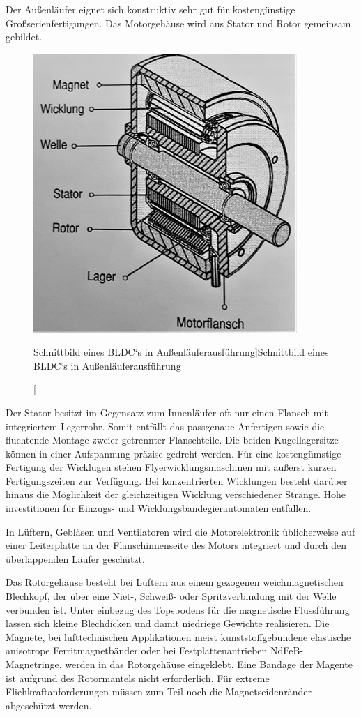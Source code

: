 Der Außenläufer eignet sich konstruktiv sehr gut für kostengünstige Großserienfertigungen. Das Motorgehäuse wird aus Stator und Rotor gemeinsam gebildet.
\begin{figure}[H]
  \centering
  \includegraphics[width=10cm]{./Grafiken/3_2}
  \caption[Schnittbild eines BLDC`s in Außenläuferausführung]{Schnittbild eines BLDC`s in Außenläuferausführung \parencite[S. 76]{Stölting2011}}
  \label{fig:3_2}
\end{figure}
Der Stator besitzt im Gegensatz zum Innenläufer oft nur einen Flansch mit integriertem Legerrohr. Somit entfällt das passgenaue Anfertigen sowie die fluchtende Montage zweier getrennter Flanschteile. Die beiden Kugellagersitze können in einer Aufspannung präzise gedreht werden. Für eine kostengümstige Fertigung der Wicklugen stehen Flyerwicklungsmaschinen mit äußerst kurzen Fertigungszeiten zur Verfügung. Bei konzentrierten Wicklungen besteht darüber hinaus die Möglichkeit der gleichzeitigen Wicklung verschiedener Stränge. Hohe investitionen für Einzugs- und Wicklungsbandegierautomaten entfallen.

In Lüftern, Gebläsen und Ventilatoren wird die Motorelektronik üblicherweise auf einer Leiterplatte an der Flanschinnenseite des Motors integriert und durch den überlappenden Läufer geschützt.

Das Rotorgehäuse besteht bei Lüftern aus einem gezogenen weichmagnetischen Blechkopf, der über eine Niet-, Schweiß- oder Spritzverbindung mit der Welle verbunden ist. Unter einbezug des Topsbodens für die magnetische Flussführung lassen sich kleine Blechdicken und damit niedriege Gewichte realisieren. Die Magnete, bei lufttechnischen Applikationen meist kunststoffgebundene elastische anisotrope Ferritmagnetbänder oder bei Festplattenantrieben NdFeB-Magnetringe, werden in das Rotorgehäuse eingeklebt. Eine Bandage der Magente ist aufgrund des Rotormantels nicht erforderlich. Für extreme Fliehkraftanforderungen müssen zum Teil noch die Magnetseidenränder abgeschützt werden.\parencite[S. 76-77]{Stölting2011}
